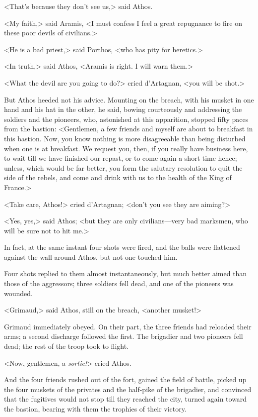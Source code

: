 <That's because they don't see us,> said Athos. 

<My faith,> said Aramis, <I must confess I feel a great repugnance to fire on these poor devils of civilians.> 

<He is a bad priest,> said Porthos, <who has pity for heretics.> 

<In truth,> said Athos, <Aramis is right. I will warn them.> 

<What the devil are you going to do?> cried d'Artagnan, <you will be shot.> 

But Athos heeded not his advice. Mounting on the breach, with his musket in one hand and his hat in the other, he said, bowing courteously and addressing the soldiers and the pioneers, who, astonished at this apparition, stopped fifty paces from the bastion: <Gentlemen, a few friends and myself are about to breakfast in this bastion. Now, you know nothing is more disagreeable than being disturbed when one is at breakfast. We request you, then, if you really have business here, to wait till we have finished our repast, or to come again a short time hence; unless, which would be far better, you form the salutary resolution to quit the side of the rebels, and come and drink with us to the health of the King of France.> 

<Take care, Athos!> cried d'Artagnan; <don't you see they are aiming?> 

<Yes, yes,> said Athos; <but they are only civilians---very bad marksmen, who will be sure not to hit me.> 

In fact, at the same instant four shots were fired, and the balls were flattened against the wall around Athos, but not one touched him. 

Four shots replied to them almost instantaneously, but much better aimed than those of the aggressors; three soldiers fell dead, and one of the pioneers was wounded. 

<Grimaud,> said Athos, still on the breach, <another musket!> 

Grimaud immediately obeyed. On their part, the three friends had reloaded their arms; a second discharge followed the first. The brigadier and two pioneers fell dead; the rest of the troop took to flight. 

<Now, gentlemen, a \textit{sortie!}> cried Athos. 

And the four friends rushed out of the fort, gained the field of battle, picked up the four muskets of the privates and the half-pike of the brigadier, and convinced that the fugitives would not stop till they reached the city, turned again toward the bastion, bearing with them the trophies of their victory. 

